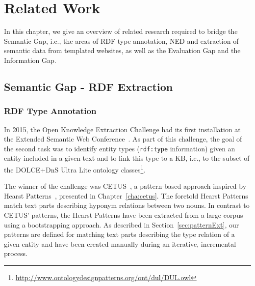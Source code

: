 \chapter{Related Work}



In this chapter, we give an overview of related research required to bridge the Semantic Gap, i.e., the areas of \ac{RDF} type annotation, \ac{NED} and extraction of semantic data from templated websites, as well as the Evaluation Gap and the Information Gap.

\section{Semantic Gap - RDF Extraction}
\subsection{RDF Type Annotation}

In 2015, the {Open Knowledge Extraction Challenge} had its first installation at the Extended Semantic Web Conference~\cite{okechallenge}.
As part of this challenge, the goal of the second task was to identify entity types (\texttt{rdf:type} information) given an entity included in a given text and to link this type to a \ac{KB}, i.e., to the subset of the DOLCE+DnS Ultra Lite ontology classes\footnote{\url{http://www.ontologydesignpatterns.org/ont/dul/DUL.owl}}.

The winner of the challenge was CETUS~\cite{CETUS_2015}, a pattern-based approach inspired by  Hearst Patterns~\cite{Hearst1992}, presented in Chapter~\ref{cha:cetus}.
The foretold Hearst Patterns match text parts describing hyponym relations between two nouns.
In contrast to CETUS' patterns, the Hearst Patterns have been extracted from a large corpus using a bootstrapping approach.
As described in Section~\ref{sec:patternExt}, our patterns are defined for matching text parts describing the type relation of a given entity and have been created manually during an iterative, incremental process.

